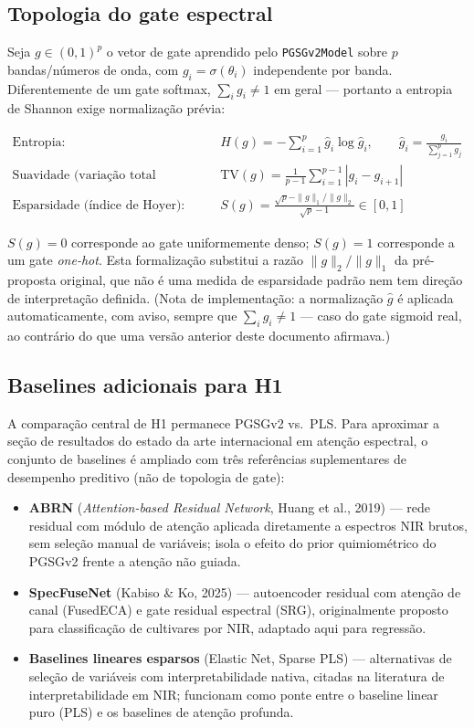 \documentclass[11pt,a4paper]{article}
\begin{document}
\subsection{Topologia do gate espectral}
\label{sec:topologia}

Seja $g \in (0,1)^p$ o vetor de gate aprendido pelo \texttt{PGSGv2Model} sobre $p$ bandas/números de onda, com $g_i = \sigma(\theta_i)$ independente por banda. Diferentemente de um gate softmax, $\sum_i g_i \neq 1$ em geral --- portanto a entropia de Shannon exige normalização prévia:

\begin{align}
\text{Entropia:}\quad & H(g) = -\sum_{i=1}^{p} \hat{g}_i \log \hat{g}_i, \qquad \hat{g}_i = \frac{g_i}{\sum_{j=1}^p g_j} \\
\text{Suavidade (variação total normalizada):}\quad & \mathrm{TV}(g) = \frac{1}{p-1}\sum_{i=1}^{p-1} |g_i - g_{i+1}| \\
\text{Esparsidade (índice de Hoyer):}\quad & S(g) = \frac{\sqrt{p} - \|g\|_1/\|g\|_2}{\sqrt{p} - 1} \in [0,1]
\end{align}

$S(g)=0$ corresponde ao gate uniformemente denso; $S(g)=1$ corresponde a um gate \emph{one-hot}. Esta formalização substitui a razão $\|g\|_2/\|g\|_1$ da pré-proposta original, que não é uma medida de esparsidade padrão nem tem direção de interpretação definida. (Nota de implementação: a normalização $\hat g$ é aplicada automaticamente, com aviso, sempre que $\sum_i g_i \neq 1$ --- caso do gate sigmoid real, ao contrário do que uma versão anterior deste documento afirmava.)

\subsection{Baselines adicionais para H1}
\label{sec:baselines}

A comparação central de H1 permanece PGSGv2 vs.\ PLS. Para aproximar a seção de resultados do estado da arte internacional em atenção espectral, o conjunto de baselines é ampliado com três referências suplementares de desempenho preditivo (não de topologia de gate):

\begin{itemize}
\item \textbf{ABRN} (\emph{Attention-based Residual Network}, Huang et al., 2019) --- rede residual com módulo de atenção aplicada diretamente a espectros NIR brutos, sem seleção manual de variáveis; isola o efeito do prior quimiométrico do PGSGv2 frente a atenção não guiada.
\item \textbf{SpecFuseNet} (Kabiso \& Ko, 2025) --- autoencoder residual com atenção de canal (FusedECA) e gate residual espectral (SRG), originalmente proposto para classificação de cultivares por NIR, adaptado aqui para regressão.
\item \textbf{Baselines lineares esparsos} (Elastic Net, Sparse PLS) --- alternativas de seleção de variáveis com interpretabilidade nativa, citadas na literatura de interpretabilidade em NIR; funcionam como ponte entre o baseline linear puro (PLS) e os baselines de atenção profunda.
\end{itemize}
\end{document}
